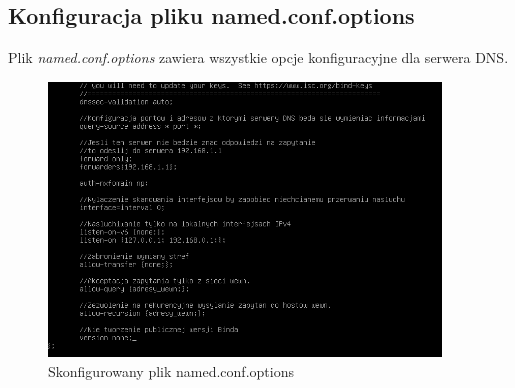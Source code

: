 \documentclass[12pt, a4paper]{article}
\begin{document}
    \subsection{Konfiguracja pliku named.conf.options}
    
        Plik \textit{named.conf.options} zawiera wszystkie opcje konfiguracyjne dla serwera DNS.
        \begin{figure}[h!]
            \centering
            \includegraphics[width=0.93\textwidth]{3.PNG}
            \caption{Skonfigurowany plik named.conf.options}
            \label{fig:conf_opt}
        \end{figure}
\end{document}
